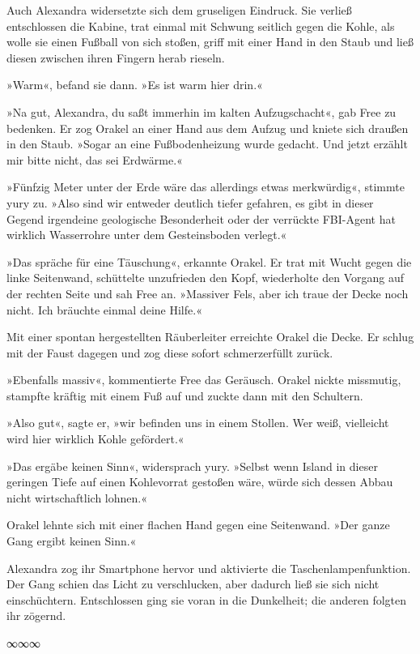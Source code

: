 Auch Alexandra widersetzte sich dem gruseligen Eindruck. Sie verließ entschlossen die Kabine, trat einmal mit Schwung seitlich gegen die Kohle, als wolle sie einen Fußball von sich stoßen, griff mit einer Hand in den Staub und ließ diesen zwischen ihren Fingern herab rieseln.

»Warm«, befand sie dann. »Es ist warm hier drin.«

»Na gut, Alexandra, du saßt immerhin im kalten Aufzugschacht«, gab Free zu bedenken. Er zog Orakel an einer Hand aus dem Aufzug und kniete sich draußen in den Staub. »Sogar an eine Fußbodenheizung wurde gedacht. Und jetzt erzählt mir bitte nicht, das sei Erdwärme.«

»Fünfzig Meter unter der Erde wäre das allerdings etwas merkwürdig«, stimmte yury zu. »Also sind wir entweder deutlich tiefer gefahren, es gibt in dieser Gegend irgendeine geologische Besonderheit oder der verrückte FBI-Agent hat wirklich Wasserrohre unter dem Gesteinsboden verlegt.«

»Das spräche für eine Täuschung«, erkannte Orakel. Er trat mit Wucht gegen die linke Seitenwand, schüttelte unzufrieden den Kopf, wiederholte den Vorgang auf der rechten Seite und sah Free an. »Massiver Fels, aber ich traue der Decke noch nicht. Ich bräuchte einmal deine Hilfe.«

Mit einer spontan hergestellten Räuberleiter erreichte Orakel die Decke. Er schlug mit der Faust dagegen und zog diese sofort schmerzerfüllt zurück.

»Ebenfalls massiv«, kommentierte Free das Geräusch. Orakel nickte missmutig, stampfte kräftig mit einem Fuß auf und zuckte dann mit den Schultern.

»Also gut«, sagte er, »wir befinden uns in einem Stollen. Wer weiß, vielleicht wird hier wirklich Kohle gefördert.«

»Das ergäbe keinen Sinn«, widersprach yury. »Selbst wenn Island in dieser geringen Tiefe auf einen Kohlevorrat gestoßen wäre, würde sich dessen Abbau nicht wirtschaftlich lohnen.«

Orakel lehnte sich mit einer flachen Hand gegen eine Seitenwand. »Der ganze Gang ergibt keinen Sinn.«

Alexandra zog ihr Smartphone hervor und aktivierte die Taschenlampenfunktion. Der Gang schien das Licht zu verschlucken, aber dadurch ließ sie sich nicht einschüchtern. Entschlossen ging sie voran in die Dunkelheit; die anderen folgten ihr zögernd.

\begin{center}
∞∞∞
\end{center}

